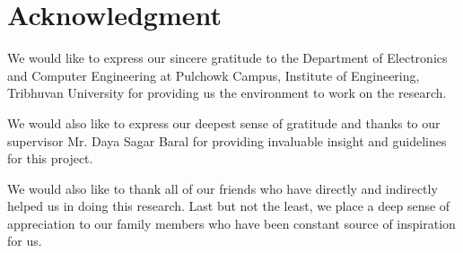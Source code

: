 \documentclass[conference]{IEEEtran}
\begin{document}

%


\section*{Acknowledgment}
We would like to express our sincere gratitude to the ​Department of Electronics and Computer Engineering at Pulchowk Campus, Institute of Engineering, Tribhuvan University for providing us the environment to work on the research.

We would also like to express our deepest sense of gratitude and thanks to our supervisor Mr. Daya Sagar Baral for providing invaluable insight and guidelines for this project.

We would also like to thank all of our friends who have directly and indirectly helped us in doing this research. Last but not the least, we place a deep sense of appreciation to our family members who have been constant source of inspiration for us.


\ifCLASSOPTIONcaptionsoff
  \newpage
\fi



\end{document}
